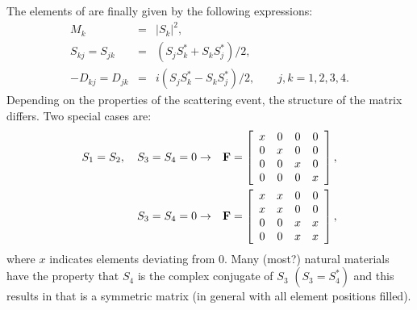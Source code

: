 The elements of  are finally given by the following
expressions:
\begin{eqnarray}
  M_k &=& |S_k|^2, \\
  S_{kj} = S_{jk} &=& (S_jS_k^\ast+S_kS_j^\ast)/2, \\
  -D_{kj} = D_{jk} &=& i(S_jS_k^\ast-S_kS_j^\ast)/2, \qquad j,k= 1, 2, 3, 4.
\end{eqnarray}
Depending on the properties of the scattering event, the structure of
the matrix  differs. Two special cases are:
\begin{eqnarray}
  \label{eq:Fcase1}
  S_1=S_2,\quad S_3=S_4=0 &\to&    \mathbf{F} =
      \left[\begin{array}{cccc}
        x&0&0&0\\
        0&x&0&0\\
        0&0&x&0\\
        0&0&0&x
      \end{array}
      \right], \\
  \label{eq:Fcase2}
  S_3=S_4=0 &\to&    \mathbf{F} =
      \left[\begin{array}{cccc}
        x&x&0&0\\
        x&x&0&0\\
        0&0&x&x\\
        0&0&x&x
      \end{array}
      \right],
\end{eqnarray}
where $x$ indicates elements deviating from 0. Many (most?)  natural
materials have the property that $S_4$ is the complex conjugate of
$S_3$ $(S_3=S_4^\ast)$ and this results in that  is a
symmetric matrix (in general with all element positions filled).



